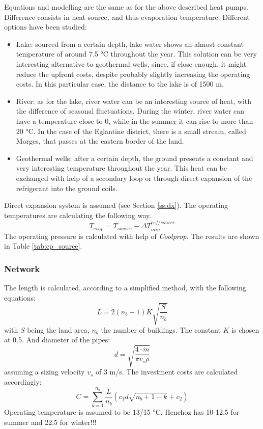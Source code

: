\documentclass{article}
\begin{document}
Equations and modelling are the same as for the above described heat pumps. Difference consists in heat source, and thus evaporation temperature. Different options have been studied:
\begin{itemize}
    \item Lake: sourced from a certain depth, lake water shows an almost constant temperature of around 7.5 \si{\celsius} throughout the year. This solution can be very interesting alternative to geothermal wells, since, if close enough, it might reduce the upfront costs, despite probably slightly increasing the operating costs. In this particular case, the distance to the lake is of 1500 m.
    \item River: as for the lake, river water can be an interesting source of heat, with the difference of seasonal fluctuations. During the winter, river water can have a temperature close to 0, while in the summer it can rise to more than 20 \si{\celsius}. In the case of the Eglantine district, there is a small stream, called Morges, that passes at the eastern border of the land.
    \item Geothermal wells: after a certain depth, the ground presents a constant and very interesting temperature throughout the year. This heat can be exchanged with help of a secondary loop or through direct expansion of the refrigerant into the ground coils.
\end{itemize}

Direct expansion system is assumed (see Section \ref{ss:dx}).
The operating temperatures are calculating the following way.
\begin{equation}
    T_{evap} = T_{source} - \Delta T_{min}^{ref/source}
\end{equation}
The operating pressure is calculated with help of \textit{Coolprop}. The results are shown in Table \ref{tab:cp_source}.


\subsubsection{Network}
The length is calculated, according to a simplified method\cite{girardinEnerGisGeographicalInformation2010}, with the following equations:
\begin{equation}
    L = 2(n_{b}-1)K\sqrt{\frac{S}{n_{b}}}
\end{equation}
with $S$ being the land area, $n_{b}$ the number of buildings. The constant $K$ is chosen at 0.5.
And diameter of the pipes:
\begin{equation}
    d = \sqrt{\frac{4\cdot \dot{m}}{\pi v_{s} \rho}}
\end{equation}
assuming a sizing velocity $v_{s}$ of 3 m/s.
The investment costs are calculated accordingly:
\begin{equation}
    C = \sum_{k=1}^{n_{b}} \frac{L}{n_{b}} (c_{1} d \sqrt{n_{b}+1-k} + c_{2})
\end{equation}
Operating temperature is assumed to be 13/15 \si{\celsius}.
Henchoz\cite{henchozPotentialRefrigerantBased} has 10-12.5 for summer and 22.5 for winter!!! 
\end{document}
